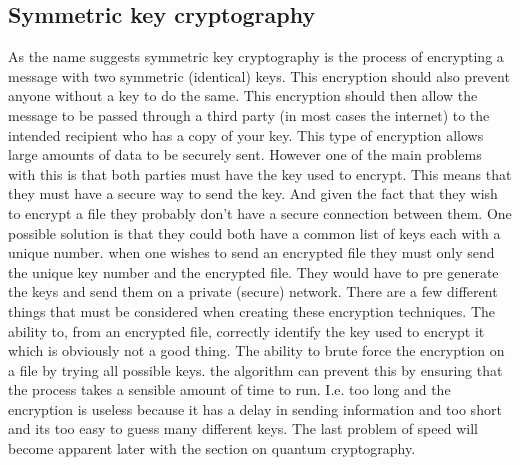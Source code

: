 \documentclass[12pt]{article}
\begin{document}
\subsection{Symmetric key cryptography}
As the name suggests symmetric key cryptography is the process of encrypting a
message with two symmetric (identical) keys. This encryption should also prevent anyone without a key to do the same. This encryption should then allow the message to be passed through a third party (in most cases the internet) to the intended recipient who has a
copy of your key. This type of encryption allows large amounts of data to be securely sent. However one of the main problems with this is that both parties must have the key used to encrypt. This means that they must have a secure way to send the key. And given the fact that
they wish to encrypt a file they probably don't have a secure connection between them. One possible solution is that they could both have a common list of keys each with a unique number. when one wishes to send an encrypted file they must only send the unique key number and the encrypted file. They would have to pre generate the keys and send them on a private (secure) network.
There are a few different things that must be considered when creating these encryption techniques. The ability to, from an encrypted file, correctly identify the key used to encrypt it which is obviously not a good thing. The ability to brute force the encryption on a file by trying all possible keys. the algorithm can prevent this by ensuring that the process takes a sensible amount of time to run. I.e. too long and the encryption is useless because it has a delay in sending information and too short and its too easy to guess many different keys. The last problem of speed will become apparent later with the section on quantum cryptography.
\end{document}
